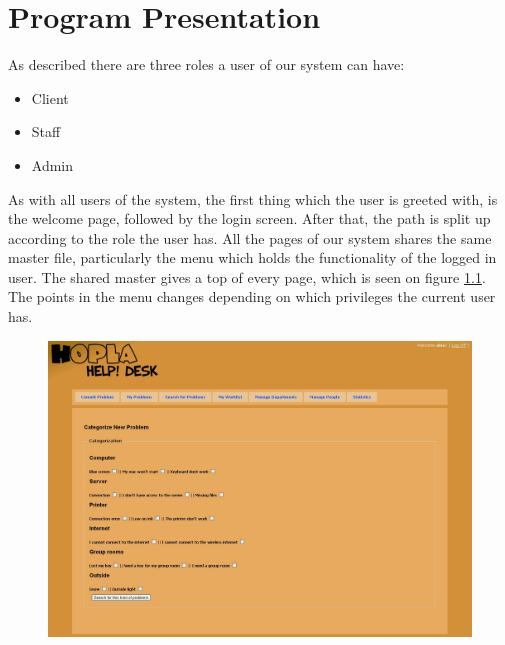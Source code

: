 \chapter{Program Presentation}
\label{chap:program_presentation}

As described there are three roles a user of our system can have:

\begin{itemize}
	\item Client
	\item Staff
	\item Admin
\end{itemize}

As with all users of the system, the first thing which the user is greeted with, is the welcome page, followed by the login screen.
After that, the path is split up according to the role the user has.
All the pages of our system shares the same master file, particularly the menu which holds the functionality of the logged in user.
The shared master gives a top of every page, which is seen on figure \ref{fig:master}.
The points in the menu changes depending on which privileges the current user has.

\begin{figure}
	\centering
		\includegraphics[width=1.00\textwidth, clip=true, trim=0cm 27.5cm 0cm 0cm]{input/implementation/program_presentation/commit.png}
	\label{fig:master}
\end{figure}


